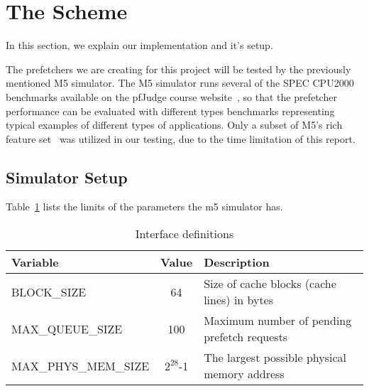 \section{The Scheme}

In this section, we explain our implementation and it's setup.

The prefetchers we are creating for this project will be tested by the
previously mentioned M5 simulator. The M5 simulator runs several of the SPEC
CPU2000 benchmarks available on the pfJudge course website~\cite{guidelines}, so
that the prefetcher performance can be evaluated with different types benchmarks
representing typical examples of different types of applications. Only a subset
of M5's rich feature set~\cite{user_doc} was utilized in our testing, due to the
time limitation of this report.



\subsection{Simulator Setup}



Table~\ref{tab:test-params} lists the limits of the parameters the m5 simulator has.
\begin{table}[h]
	\caption{Interface definitions}
	\begin{tabularx}{\linewidth}{|X|c|X|}
	\hline
	Variable & Value & Description \\
	\hline
	BLOCK\_SIZE & 64 & Size of cache blocks (cache lines) in bytes \\
	\hline
	MAX\_QUEUE\_SIZE & 100 & Maximum number of pending prefetch requests \\
	\hline
	MAX\_PHYS\_MEM\_SIZE & $2^{28}$-1 & The largest possible physical memory address \\
	\hline
	\end{tabularx}
	\label{tab:test-params}
\end{table}

